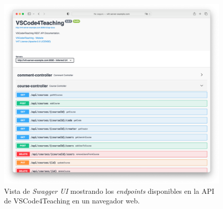 \begin{figure}[ht]
    \centering
    \includegraphics[width=\textwidth]{imagenes/utilizadas/4-3-implementacion/rn4-1.png}
    \caption{Vista de \textit{Swagger UI} mostrando los \textit{endpoints} disponibles en la API de VSCode4Teaching en un navegador web.}
    \label{fig:reqn4-1}
\end{figure}
